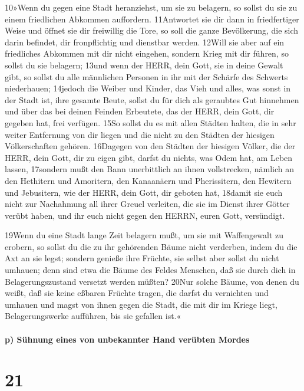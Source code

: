 10»Wenn du gegen eine Stadt heranziehst, um sie zu belagern, so sollst
du sie zu einem friedlichen Abkommen auffordern. 11Antwortet sie dir
dann in friedfertiger Weise und öffnet sie dir freiwillig die Tore, so
soll die ganze Bevölkerung, die sich darin befindet, dir fronpflichtig
und dienstbar werden. 12Will sie aber auf ein friedliches Abkommen mit
dir nicht eingehen, sondern Krieg mit dir führen, so sollst du sie
belagern; 13und wenn der HERR, dein Gott, sie in deine Gewalt gibt, so
sollst du alle männlichen Personen in ihr mit der Schärfe des Schwerts
niederhauen; 14jedoch die Weiber und Kinder, das Vieh und alles, was
sonst in der Stadt ist, ihre gesamte Beute, sollst du für dich als
geraubtes Gut hinnehmen und über das bei deinen Feinden Erbeutete, das
der HERR, dein Gott, dir gegeben hat, frei verfügen. 15So sollst du es
mit allen Städten halten, die in sehr weiter Entfernung von dir liegen
und die nicht zu den Städten der hiesigen Völkerschaften gehören.
16Dagegen von den Städten der hiesigen Völker, die der HERR, dein Gott,
dir zu eigen gibt, darfst du nichts, was Odem hat, am Leben lassen,
17sondern mußt den Bann unerbittlich an ihnen vollstrecken, nämlich an
den Hethitern und Amoritern, den Kanaanäern und Pherissitern, den
Hewitern und Jebusitern, wie der HERR, dein Gott, dir geboten hat,
18damit sie euch nicht zur Nachahmung all ihrer Greuel verleiten, die
sie im Dienst ihrer Götter verübt haben, und ihr euch nicht gegen den
HERRN, euren Gott, versündigt.

19Wenn du eine Stadt lange Zeit belagern mußt, um sie mit Waffengewalt
zu erobern, so sollst du die zu ihr gehörenden Bäume nicht verderben,
indem du die Axt an sie legst; sondern genieße ihre Früchte, sie selbst
aber sollst du nicht umhauen; denn sind etwa die Bäume des Feldes
Menschen, daß sie durch dich in Belagerungszustand versetzt werden
müßten? 20Nur solche Bäume, von denen du weißt, daß sie keine eßbaren
Früchte tragen, die darfst du vernichten und umhauen und magst von ihnen
gegen die Stadt, die mit dir im Kriege liegt, Belagerungswerke
aufführen, bis sie gefallen ist.«

\hypertarget{p-suxfchnung-eines-von-unbekannter-hand-veruxfcbten-mordes}{%
\paragraph{p) Sühnung eines von unbekannter Hand verübten
Mordes}\label{p-suxfchnung-eines-von-unbekannter-hand-veruxfcbten-mordes}}

\hypertarget{section-20}{%
\section{21}\label{section-20}}


